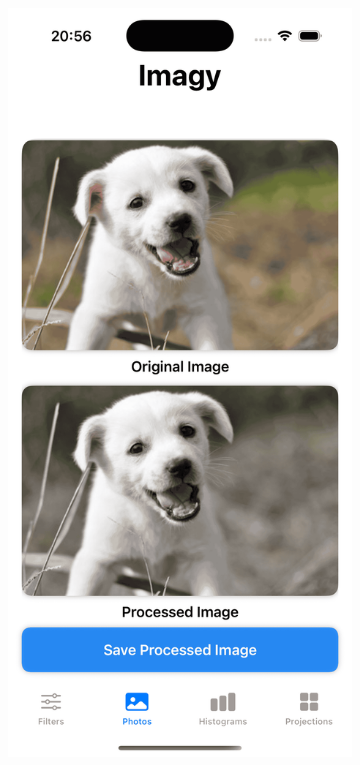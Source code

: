 \documentclass[a4paper]{article}
\begin{document}
\begin{figure}[H]
    \centering
    \begin{subfigure}{0.2\textwidth}
        \centering
        \includegraphics[width=\linewidth]{images/dog_saturation_0.3.png}

\end{subfigure}
\end{figure}
\end{document}
